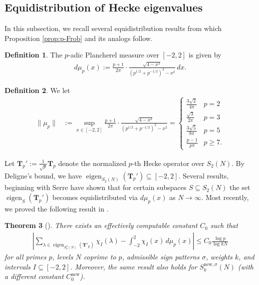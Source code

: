 \documentclass[11pt,letterpaper,reqno]{amsart}
\newtheorem{theorem}{Theorem}[section]
\theoremstyle{definition}
\newtheorem{definition}[theorem]{Definition}
\numberwithin{equation}{section}
\numberwithin{figure}{section}
\numberwithin{table}{section}
\let\subsectiontemp\subsection
\renewcommand{\subsection}[1]{ 
    \subsectiontemp{#1} \hfill\vspace{0.5\linespacing} 
}
\newcommand{\nw}{\mathrm{new}}
\newcommand{\eigen}{\operatorname{eigen}}
\begin{document}
\subsection{Equidistribution of Hecke eigenvalues}\label{subsection:equidistribution-survey}

In this subsection, we recall several equidistribution results from which Proposition \ref{prop:p-Frob} and its analogs follow.

\begin{definition}
    The $p$-adic Plancherel measure over $[-2, 2]$ is given by
    \begin{align}
        d\mu_p(x) := \frac{p + 1}{2\pi} \cdot \frac{\sqrt{4 - x^2}}{\left( p^{1/2} + p^{-1/2}  \right)^2 -  x^2} \,dx. \label{eqn:definition-of-Plancherel}
    \end{align}
\end{definition}

\begin{definition} \label{def:mu-p}
    We let
    \begin{align}
        \| \mu_p\| &:= \sup_{x \in [-2, 2]} \frac{p + 1}{2\pi} \cdot \frac{\sqrt{4 - x^2}}{\left( p^{1/2} + p^{-1/2}  \right)^2 -  x^2} = \begin{cases}
        \frac{3\sqrt{2}}{4\pi} & p = 2\\
        \frac{\sqrt{3}}{2\pi} & p = 3\\
        \frac{3\sqrt{5}}{8\pi} & p = 5\\
        \frac{p - 1}{p\pi} & p \geq 7.
    \end{cases}
    \end{align}
\end{definition}

Let $\mathbf{T}_p' := \frac{1}{\sqrt{p}} \mathbf{T}_p$ denote the normalized $p$-th Hecke operator over $S_2(N)$. By Deligne's bound, we have $\eigen_{S_2(N)}(\mathbf{T}_p') \subseteq [-2, 2].$ Several results, beginning with Serre \cite[Th\'eor\`eme 1]{ser97} have shown that for certain subspaces $S \subseteq S_2(N)$ the set $\eigen_{S}(\mathbf{T}_p')$ becomes equidistributed via $d\mu_p(x)$ as $N \rightarrow \infty.$ Most recently, we proved the following result in \cite[Theorem 1.1]{KMRX}.

\begin{theorem}[{\cite[Theorem 1.1]{KMRX}}]
There exists an effectively computable constant $C_0$ such that 
    \begin{align}
        \left| \sum_{\lambda \in \operatorname{eigen}_{S_k^{\sigma}(N)}(\mathbf{T}'_p)} \chi_I(\lambda) - \int_{-2}^2 \chi_I(x) \, d \mu_p(x)  \right| \le C_0  \frac{\log p}{\log kN} \label{eqn:KMRX-thm-1.1}
    \end{align}
    for all primes $p$, levels $N$ coprime to $p$, admissible sign patterns $\sigma$, weights $k$, and intervals $I \subseteq [-2,2]$. Moreover, the same result also holds for $S_k^{\nw,\sigma}(N)$ (with a different constant $C_0^\nw$).
\end{theorem}
\end{document}

